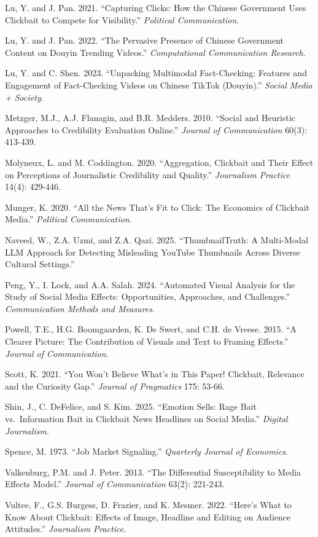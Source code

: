 \documentclass[
  fontset=none]{ctexart}
\begin{document}
Lu, Y. and J. Pan. 2021. ``Capturing Clicks: How the Chinese Government Uses Clickbait to Compete for Visibility.'' \emph{Political Communication}.

Lu, Y. and J. Pan. 2022. ``The Pervasive Presence of Chinese Government Content on Douyin Trending Videos.'' \emph{Computational Communication Research}.

Lu, Y. and C. Shen. 2023. ``Unpacking Multimodal Fact-Checking: Features and Engagement of Fact-Checking Videos on Chinese TikTok (Douyin).'' \emph{Social Media + Society}.

Metzger, M.J., A.J. Flanagin, and B.R. Medders. 2010. ``Social and Heuristic Approaches to Credibility Evaluation Online.'' \emph{Journal of Communication} 60(3): 413-439.

Molyneux, L. and M. Coddington. 2020. ``Aggregation, Clickbait and Their Effect on Perceptions of Journalistic Credibility and Quality.'' \emph{Journalism Practice} 14(4): 429-446.

Munger, K. 2020. ``All the News That's Fit to Click: The Economics of Clickbait Media.'' \emph{Political Communication}.

Naveed, W., Z.A. Uzmi, and Z.A. Qazi. 2025. ``ThumbnailTruth: A Multi-Modal LLM Approach for Detecting Misleading YouTube Thumbnails Across Diverse Cultural Settings.''


Peng, Y., I. Lock, and A.A. Salah. 2024. ``Automated Visual Analysis for the Study of Social Media Effects: Opportunities, Approaches, and Challenges.'' \emph{Communication Methods and Measures}.

Powell, T.E., H.G. Boomgaarden, K. De Swert, and C.H. de Vreese. 2015. ``A Clearer Picture: The Contribution of Visuals and Text to Framing Effects.'' \emph{Journal of Communication}.

Scott, K. 2021. ``You Won't Believe What's in This Paper! Clickbait, Relevance and the Curiosity Gap.'' \emph{Journal of Pragmatics} 175: 53-66.

Shin, J., C. DeFelice, and S. Kim. 2025. ``Emotion Sells: Rage Bait vs.~Information Bait in Clickbait News Headlines on Social Media.'' \emph{Digital Journalism}.

Spence, M. 1973. ``Job Market Signaling.'' \emph{Quarterly Journal of Economics}.

Valkenburg, P.M. and J. Peter. 2013. ``The Differential Susceptibility to Media Effects Model.'' \emph{Journal of Communication} 63(2): 221-243.


Vultee, F., G.S. Burgess, D. Frazier, and K. Mesmer. 2022. ``Here's What to Know About Clickbait: Effects of Image, Headline and Editing on Audience Attitudes.'' \emph{Journalism Practice}.
\end{document}
